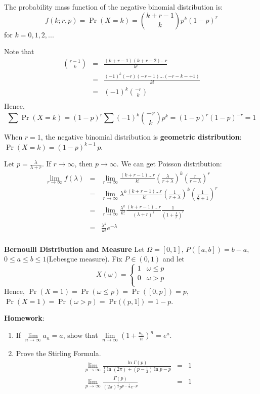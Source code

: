 \documentclass[11pt]{article}
\begin{document}
The probability mass function of the negative binomial distribution is:
\[f(k; r,p) = \Pr(X = k) = {k+r-1 \choose k} p^k (1-p)^r\]
for $k = 0, 1, 2, ...$

Note that \begin{eqnarray*}
{r-1 \choose k}&=&\frac{(k+r-1)(k+r-2)\dots r}{k!} \\
&=&\frac{(-1)^{k}(-r)(-r-1)\dots(-r-k-+1)}{k!}\\
&=&(-1)^k{-r \choose k}\\
\end{eqnarray*}
Hence, $$\sum{\Pr(X=k)}=(1-p)^r\sum{(-1)^k{-r \choose k}p^k}=(1-p)^r(1-p)^{-r}=1$$

When $r=1$, the negative binomial distribution is \textbf{geometric distribution}:$\Pr(X = k) = (1-p)^{k-1}\,p$.

Let $p=\frac{\lambda}{\lambda+r}$. If $r \rightarrow \infty$, then $p \rightarrow \infty$. We can get Poisson distribution:
\begin{eqnarray*}
\lim_{r\rightarrow\infty}f(\lambda) &=& \lim_{r\rightarrow\infty}\frac{(k+r-1)\dots r}{k!}\left(\frac{\lambda}{r+\lambda}\right)^k\left(\frac{r}{r+\lambda}\right)^r \\
&=&\lim_{r\rightarrow\infty}\lambda^k\frac{(k+r-1)\dots r}{k!}\left(\frac{1}{r+\lambda}\right)^k\left(\frac{1}{\frac{\lambda}{r}+1}\right)^r \\
&=&\lim_{r\rightarrow\infty}\frac{\lambda^k}{k!}\frac{(k+r-1)\dots r}{(\lambda+r)^k}\frac{1}{\left(1+\frac{\lambda}{r}\right)^r} \\
&=&\frac{\lambda^k}{k!}e^{-\lambda} \\
\end{eqnarray*} 

\textbf{Bernoulli Distribution and Measure}
Let $\Omega=[0, 1]$, $P([a,b])=b-a$, $0\le a\le b\le 1$(Lebesgue measure).
Fix $P \in (0,1)$ and let \[X(\omega) = \left\{\begin{array}{cc}
1 & \omega\le p \\
0 & \omega > p \\
\end{array}
\right.
\]
Hence, $\Pr(X=1)=\Pr(\omega\le p)=\Pr([0,p])=p$, $\Pr(X=1)=\Pr(\omega> p)=\Pr((p,1])=1-p$.

\textbf{Homework}:
\begin{enumerate}[(1)]
\item
If $\lim \limits_{n\rightarrow\infty}a_n=a$, show that $\lim \limits_{n\rightarrow\infty}\left(1+\frac{a_n}{n}\right)^n=e^{a}$.
\item
Prove the Stirling Formula.
\begin{eqnarray*}
\lim_{p\rightarrow\infty}\frac{\ln\Gamma(p)}{\frac{1}{2}\ln(2\pi)+(p-\frac{1}{2})\ln{p}-p}&=&1\\
\lim_{p\rightarrow\infty}\frac{\Gamma(p)}{(2\pi)^{\frac{1}{2}}p^{p-\frac{1}{2}}e^{-p}}&=&1
\end{eqnarray*}
\end{enumerate}
\end{document}
